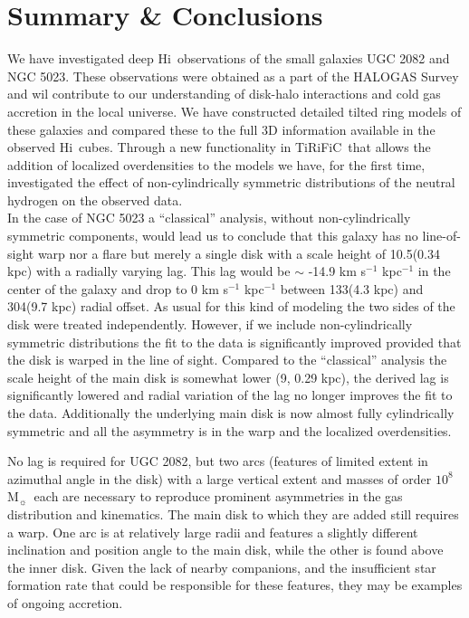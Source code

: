 \documentclass[useAMS,usenatbib]{mn2e}
\newcommand{\msun}{M$_{\sun}$}
\newcommand\tiri{{\sc TiRiFiC}}
\newcommand\HI{H{\sc i}}
\begin{document}
{\section{Summary \& Conclusions}\label{sum}
We have investigated deep \HI\ observations of the small galaxies UGC 2082 and NGC 5023. These observations were obtained as a part of the HALOGAS Survey and wil contribute to our understanding of disk-halo interactions and cold gas accretion in the local universe.  We have constructed detailed tilted ring models of these galaxies and compared these to the full 3D information available in the observed \HI\ cubes. Through a new functionality in \tiri\ that allows the addition of localized overdensities to the models we have, for the first time, investigated the effect of non-cylindrically symmetric distributions of the neutral hydrogen on the observed data.\\
\indent In the case of NGC 5023 a ``classical'' analysis, without  non-cylindrically symmetric components, would lead us to conclude that this galaxy has no line-of-sight warp nor a flare but merely a single disk with a scale height of 10.5\arcsec (0.34 kpc) with a radially varying lag. This lag would be $\sim$ -14.9 km s$^{-1}$ kpc$^{-1}$ in the center of the galaxy  and drop to 0 km s$^{-1}$ kpc$^{-1}$ between 133\arcsec (4.3 kpc) and 304\arcsec  (9.7 kpc) radial offset. As usual for this kind of modeling the two sides of the disk were treated independently. However, if we include non-cylindrically symmetric distributions the fit to the data is significantly improved provided that the disk is warped in the line of sight. Compared to the ``classical'' analysis the scale height of the main disk is somewhat lower  (9\arcsec, 0.29 kpc),  the derived lag is significantly lowered and radial variation of the lag no longer improves the fit to the data. Additionally the underlying main disk is now almost fully cylindrically symmetric and all the asymmetry is in the warp and the localized overdensities.

No lag is required for UGC 2082, but two arcs (features of limited
extent in azimuthal angle in the disk) with a large vertical extent
and masses of order $10^8$ \msun\ each are necessary to reproduce
prominent asymmetries in the gas distribution and kinematics.  The main
disk to which they are added still requires a warp.  One arc
is at relatively large radii and features a slightly different
inclination and position angle to the main disk, while the other is
found above the inner disk.  Given the lack of nearby companions, and the insufficient star formation rate that could be responsible for these features, they may be examples of ongoing accretion.

}
\end{document}
